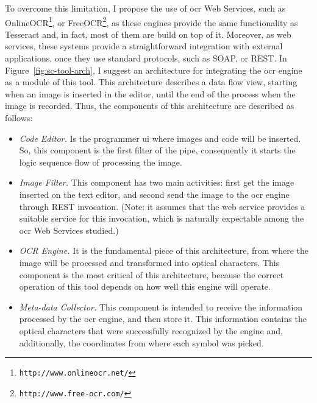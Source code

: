 To overcome this limitation, I propose the use of \gls{ocr} Web Services, such as OnlineOCR\footnote{\texttt{http://www.onlineocr.net/}}, or FreeOCR\footnote{\texttt{http://www.free-ocr.com/}}, as these engines provide the same functionality as Tesseract and, in fact, most of them are build on top of it. Moreover, as web services, these systems provide a straightforward integration with external applications, once they use standard protocols, such as SOAP, or REST. In Figure~\ref{fig:sc-tool-arch}, I suggest an architecture for integrating the \gls{ocr} engine as a module of this tool. This architecture describes a data flow view, starting when an image is inserted in the editor, until the end of the process when the image is recorded. Thus, the components of this architecture are described as follows:

\begin{itemize}
\item \textit{Code Editor.} Is the programmer \gls{ui} where images and code will be inserted. So, this component is the first filter of the pipe, consequently it starts the logic sequence flow of processing the image.

\item \textit{Image Filter.} This component has two main activities: first get the image inserted on the text editor, and second send the image to the \gls{ocr} engine through REST invocation. (Note: it assumes that the web service provides a suitable service for this invocation, which is naturally expectable among the \gls{ocr} Web Services studied.)

\item \textit{OCR Engine.} It is the fundamental piece of this architecture, from where the image will be processed and transformed into optical characters. This component is the most critical of this architecture, because the correct operation of this tool depends on how well this engine will operate.

\item \textit{Meta-data Collector.} This component is intended to receive the information processed by the \gls{ocr} engine, and then store it. This information contains the optical characters that were successfully recognized by the engine and, additionally, the coordinates from where each symbol was picked. 
\end{itemize}

